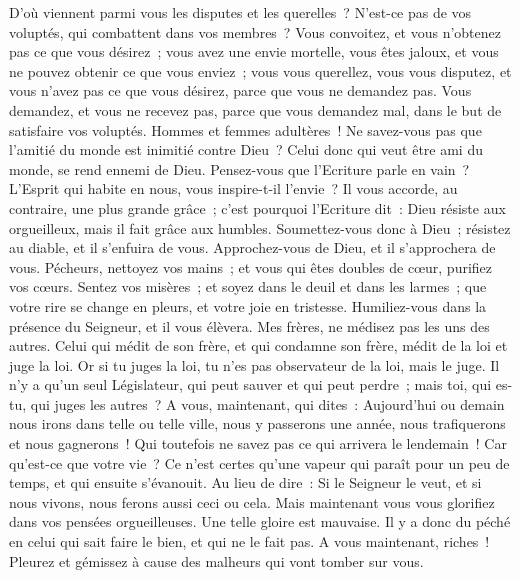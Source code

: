 \begin{multicols}{2}
\VerseOne{}D'où viennent parmi vous les disputes et les querelles~? N'est-ce pas de vos voluptés, qui combattent dans vos membres~?
Vous convoitez, et vous n'obtenez pas ce que vous désirez~; vous avez une envie mortelle, vous êtes jaloux, et vous ne pouvez obtenir ce que vous enviez~; vous vous querellez, vous vous disputez, et vous n'avez pas ce que vous désirez, parce que vous ne demandez pas.
Vous demandez, et vous ne recevez pas, parce que vous demandez mal, dans le but de satisfaire vos voluptés.
Hommes et femmes adultères~! Ne savez-vous pas que l'amitié du monde est inimitié contre Dieu~? Celui donc qui veut être ami du monde, se rend ennemi de Dieu.
Pensez-vous que l'Ecriture parle en vain~? L'Esprit qui habite en nous, vous inspire-t-il l'envie~?
Il vous accorde, au contraire, une plus grande grâce~; c'est pourquoi l'Ecriture dit~: Dieu résiste aux orgueilleux, mais il fait grâce aux humbles.
Soumettez-vous donc à Dieu~; résistez au diable, et il s'enfuira de vous.
Approchez-vous de Dieu, et il s'approchera de vous. Pécheurs, nettoyez vos mains~; et vous qui êtes doubles de cœur, purifiez vos cœurs.
Sentez vos misères~; et soyez dans le deuil et dans les larmes~; que votre rire se change en pleurs, et votre joie en tristesse.
Humiliez-vous dans la présence du Seigneur, et il vous élèvera.
Mes frères, ne médisez pas les uns des autres. Celui qui médit de son frère, et qui condamne son frère, médit de la loi et juge la loi. Or si tu juges la loi, tu n'es pas observateur de la loi, mais le juge.
Il n'y a qu'un seul Législateur, qui peut sauver et qui peut perdre~; mais toi, qui es-tu, qui juges les autres~?
A vous, maintenant, qui dites~: Aujourd'hui ou demain nous irons dans telle ou telle ville, nous y passerons une année, nous trafiquerons et nous gagnerons~!
Qui toutefois ne savez pas ce qui arrivera le lendemain~! Car qu'est-ce que votre vie~? Ce n'est certes qu'une vapeur qui paraît pour un peu de temps, et qui ensuite s'évanouit.
Au lieu de dire~: Si le Seigneur le veut, et si nous vivons, nous ferons aussi ceci ou cela.
Mais maintenant vous vous glorifiez dans vos pensées orgueilleuses. Une telle gloire est mauvaise.
Il y a donc du péché en celui qui sait faire le bien, et qui ne le fait pas.
\VerseOne{}A vous maintenant, riches~! Pleurez et gémissez à cause des malheurs qui vont tomber sur vous.

\end{multicols}
